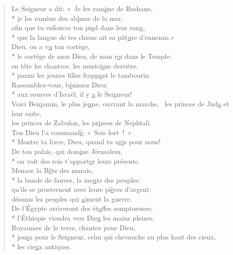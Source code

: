 \begin{verse}
Le Seigneur a dit: « Je les ram\underline{è}ne de Bashane, \\*
je les ramène des ab\underline{î}mes de la mer, \\
afin que tu enfonces ton pi\underline{e}d dans leur sang, \\*
que la langue de tes chiens ait sa pât\underline{u}re d’ennemis.» \\

Dieu, on a v\underline{u} ton cortège, \\*
le cortège de mon Dieu, de mon r\underline{o}i dans le Temple: \\
en tête les chantres, les musici\underline{e}ns derrière, \\*
parmi les jeunes filles frapp\underline{a}nt le tambourin. \\

Rassemblez-vous, b\underline{é}nissez Dieu; \\*
aux sources d’Israël, il y \underline{a} le Seigneur! \\
Voici Benjamin, le plus je\underline{u}ne, ouvrant la marche,~\psalmdagger
les princes de Jud\underline{a} et leur suite, \\
les princes de Zabulon, les pr\underline{i}nces de Nephtali. \\

Ton Dieu l’a command\underline{é}: « Sois fort ! » \\*
Montre ta force, Dieu, quand tu ag\underline{i}s pour nous! \\
De ton palais, qui dom\underline{i}ne Jérusalem, \\*
on voit des rois t’apport\underline{e}r leurs présents. \\

Menace la B\underline{ê}te des marais, \\*
la bande de fauves, la me\underline{u}te des peuples: \\
qu’ils se prosternent avec leurs pi\underline{è}ces d’argent; \\
désunis les peuples qui \underline{a}iment la guerre. \\

De l’Égypte arriveront des ét\underline{o}ffes somptueuses; \\*
l’Éthiopie viendra vers Die\underline{u} les mains pleines. \\
Royaumes de la terre, chantez pour Dieu, \\*
jou\underline{e}z pour le Seigneur,\psalmstar
{}celui qui chevauche au plus haut des cieux, \\*
les cie\underline{u}x antiques. \\


\end{verse}

